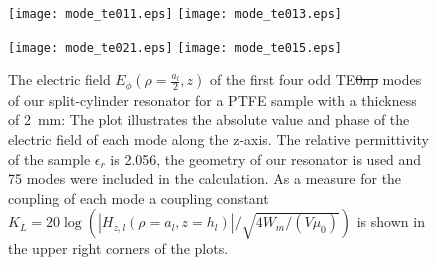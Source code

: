 \begin{figure}
\centering
\texttt{[image: mode\_te011.eps]}
\texttt{[image: mode\_te013.eps]}
\end{figure}

\begin{figure}
\centering
\texttt{[image: mode\_te021.eps]}
\texttt{[image: mode\_te015.eps]}
\caption{The electric field $E_{\phi}(\rho=\frac{a_l}{2},z)$ of the first four odd TE\st{0np} modes of our split-cylinder resonator for a PTFE sample with a thickness of \SI{2}{\milli\meter}: The plot illustrates the absolute value and phase of the electric field of each mode along the z-axis. The relative permittivity of the sample $\epsilon_r$ is 2.056, the geometry of our resonator is used and 75 modes were included in the calculation. As a measure for the coupling of each mode a coupling constant $K_L=20\log(|H_{z,l}(\rho=a_l,z=h_l)|/\sqrt{4W_m/(V\mu_0)})$ is shown in the upper right corners of the plots.}\label{fig:first_modes}
\end{figure}

